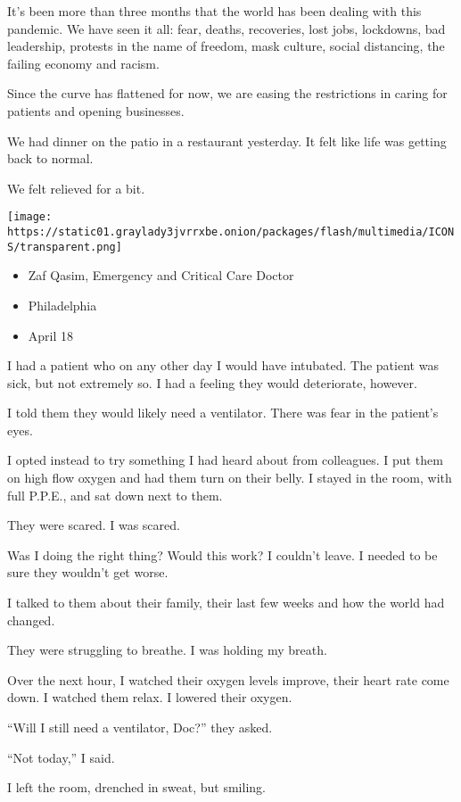 It's been more than three months that the world has been dealing with
this pandemic. We have seen it all: fear, deaths, recoveries, lost jobs,
lockdowns, bad leadership, protests in the name of freedom, mask
culture, social distancing, the failing economy and racism.

Since the curve has flattened for now, we are easing the restrictions in
caring for patients and opening businesses.

We had dinner on the patio in a restaurant yesterday. It felt like life
was getting back to normal.

We felt relieved for a bit.

\texttt{[image: https://static01.graylady3jvrrxbe.onion/packages/flash/multimedia/ICONS/transparent.png]}

\begin{itemize}
\tightlist
\item
  Zaf Qasim, Emergency and Critical Care Doctor
\item
  Philadelphia
\item
  April 18
\end{itemize}

I had a patient who on any other day I would have intubated. The patient
was sick, but not extremely so. I had a feeling they would deteriorate,
however.

I told them they would likely need a ventilator. There was fear in the
patient's eyes.

I opted instead to try something I had heard about from colleagues. I
put them on high flow oxygen and had them turn on their belly. I stayed
in the room, with full P.P.E., and sat down next to them.

They were scared. I was scared.

Was I doing the right thing? Would this work? I couldn't leave. I needed
to be sure they wouldn't get worse.

I talked to them about their family, their last few weeks and how the
world had changed.

They were struggling to breathe. I was holding my breath.

Over the next hour, I watched their oxygen levels improve, their heart
rate come down. I watched them relax. I lowered their oxygen.

``Will I still need a ventilator, Doc?'' they asked.

``Not today,'' I said.

I left the room, drenched in sweat, but smiling.

